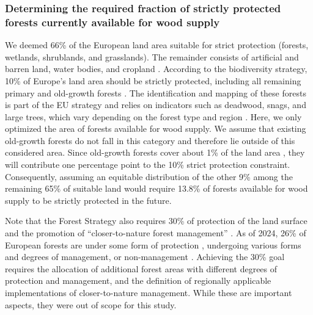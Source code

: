 \documentclass[]{article}
\begin{document}
\subsubsection{Determining the required fraction of strictly protected forests currently available for wood supply}\label{sec:fractions}

We deemed 66\% of the European land area suitable for strict protection (forests, wetlands, shrublands, and grasslands). The remainder consists of artificial and barren land, water bodies, and cropland \parencite{Eurostat2023}.
According to the biodiversity strategy, 10\% of Europe's land area should be strictly protected, including all remaining primary and old-growth forests \parencite{EuropeanCommissionBiodivStrat2020}.
The identification and mapping of these forests is part of the EU strategy and relies on indicators such as deadwood, snags, and large trees, which vary depending on the forest type and region \parencite{EUMapPristineForests2023}. Here, we only optimized the area of forests available for wood supply. We assume that existing old-growth forests do not fall in this category and therefore lie outside of this considered area. Since old-growth forests cover about 1\% of the land area \parencite{EUForestStrategy2030}, they will contribute one percentage point to the 10\% strict protection constraint.
Consequently, assuming an equitable distribution of the other 9\% among the remaining 65\% of suitable land would require 13.8\% of forests available for wood supply to be strictly protected in the future.

Note that the Forest Strategy also requires 30\% of protection of the land surface and the promotion of ``closer-to-nature forest management'' \parencite{Larsen2022}. As of 2024, 26\% of European forests are under some form of protection \parencite{EUForestStrategy2030}, undergoing various forms and degrees of management, or non-management \parencite{Verkerk2014}. Achieving the 30\% goal requires the allocation of additional forest areas with different degrees of protection and management, and the definition of regionally applicable implementations of closer-to-nature management. While these are important aspects, they were out of scope for this study.

\end{document}
